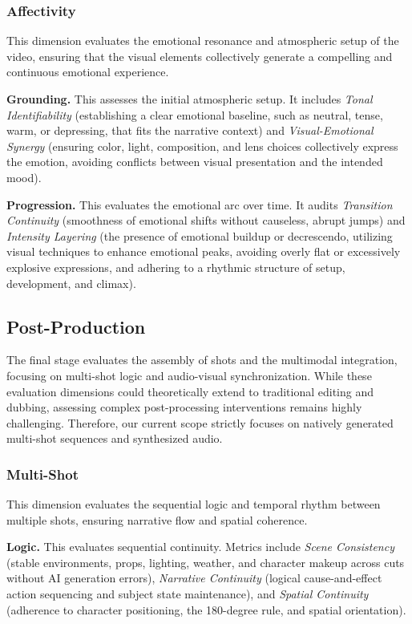 \documentclass{article}
\begin{document}
\subsubsection{Affectivity}
\noindent
This dimension evaluates the emotional resonance and atmospheric setup of the video, ensuring that the visual elements collectively generate a compelling and continuous emotional experience.

\noindent
\textbf{Grounding.} This assesses the initial atmospheric setup. It includes \textit{Tonal Identifiability} (establishing a clear emotional baseline, such as neutral, tense, warm, or depressing, that fits the narrative context) and \textit{Visual-Emotional Synergy} (ensuring color, light, composition, and lens choices collectively express the emotion, avoiding conflicts between visual presentation and the intended mood).

\noindent
\textbf{Progression.} This evaluates the emotional arc over time. It audits \textit{Transition Continuity} (smoothness of emotional shifts without causeless, abrupt jumps) and \textit{Intensity Layering} (the presence of emotional buildup or decrescendo, utilizing visual techniques to enhance emotional peaks, avoiding overly flat or excessively explosive expressions, and adhering to a rhythmic structure of setup, development, and climax).

\subsection{Post-Production}
The final stage evaluates the assembly of shots and the multimodal integration, focusing on multi-shot logic and audio-visual synchronization. While these evaluation dimensions could theoretically extend to traditional editing and dubbing, assessing complex post-processing interventions remains highly challenging. Therefore, our current scope strictly focuses on natively generated multi-shot sequences and synthesized audio.

\subsubsection{Multi-Shot}
\noindent
This dimension evaluates the sequential logic and temporal rhythm between multiple shots, ensuring narrative flow and spatial coherence.

\noindent
\textbf{Logic.} This evaluates sequential continuity. Metrics include \textit{Scene Consistency} (stable environments, props, lighting, weather, and character makeup across cuts without AI generation errors), \textit{Narrative Continuity} (logical cause-and-effect action sequencing and subject state maintenance), and \textit{Spatial Continuity} (adherence to character positioning, the 180-degree rule, and spatial orientation).
\end{document}
